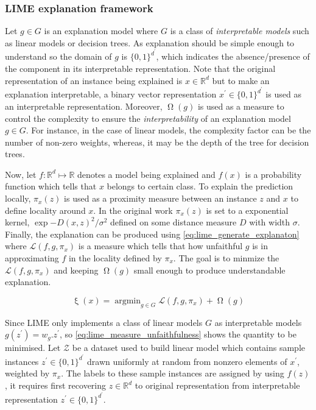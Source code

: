 \documentclass[english]{tktltiki2}
\theoremstyle{definition}
\theoremstyle{remark}
\DeclareMathOperator*{\argmin}{argmin}
\begin{document}
\subsubsection{LIME explanation framework} %
Let $g \in G$ is an explanation model where $G$ is a class of \textit{interpretable models} such as linear models or decision trees. As explanation should be simple enough to understand so the domain of  $g$ is $\{0, 1\}^{d^\prime}$, which indicates the absence/presence of the component in its interpretable representation. Note that the original representation of an instance being explained is $x \in \mathbb{R}^d$ but to make an explanation interpretable, a binary vector representation $x^\prime \in \{0, 1\}^{d^\prime}$ is used as an interpretable representation. Moreover, $\upOmega(g)$ is used as a measure to control the complexity to ensure the \textit{interpretability} of an explanation model $g \in G$. For instance, in the case of linear models, the complexity factor can be the number of non-zero weights, whereas, it may be the depth of the tree for decision trees.

Now, let $f: \mathbb{R}^d \mapsto \mathbb{R}$ denotes a model being explained and $f(x)$ is a probability function which tells that $x$ belongs to certain class. To explain the prediction locally, $\pi_x(z)$ is used as a proximity measure between an instance $z$ and $x$ to define locality around $x$. In the original work \citep{ribeiro2016should} $\pi_x(z)$ is set to a exponential kernel, $\exp{-D(x,z)^2/\sigma^2}$ defined on some distance measure $D$ with width $\sigma$.
Finally, the explanation can be produced using \eqref{eq:lime_generate_explanaton} where $\mathcal{L}(f, g, \pi_x)$ is a measure which tells that how unfaithful $g$ is in approximating $f$ in the locality defined by $\pi_x$. The goal is to minmize the $\mathcal{L}(f, g, \pi_x)$ and keeping $\upOmega(g)$ small enough to produce understandable explanation.

\begin{equation}\label{eq:lime_generate_explanaton}
\mathsf{\upxi}(x) = \argmin_{g \in G} \mathcal{L}(f, g, \pi_x) + \upOmega(g)
\end{equation}

Since LIME \citep{ribeiro2016should} only implements a class of linear models $G$ as interpretable models $g(z^\prime)=w_g.z^\prime$, so \eqref{eq:lime_measure_unfaithfulness} shows the quantity to be minimised. Let $\mathcal{Z}$ be a dataset used to build linear model which contains sample instances $z^\prime \in \{0, 1\}^{d^\prime}$ drawn uniformly at random from nonzero elements of $x^\prime$, weighted by $\pi_x$. The labels to these sample instances are assigned by using $f(z)$, it requires first recovering $z \in \mathbb{R}^d$ to original representation from interpretable representation  $z^\prime \in \{0, 1\}^{d^\prime}$. 
\end{document}
